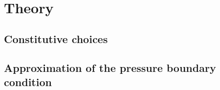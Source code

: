 \section{Theory}
\label{section: brittle/theory}

\subsection{Constitutive choices}

\subsection{Approximation of the pressure boundary condition}
